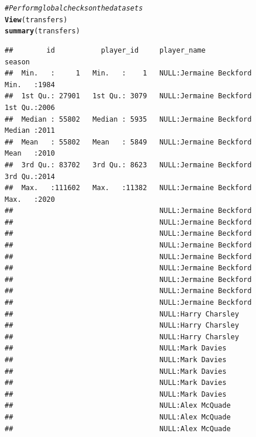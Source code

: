 \documentclass{article}\usepackage[]{graphicx}\usepackage[]{color}
\makeatletter
\newcommand{\hlcom}[1]{\textcolor[rgb]{0.678,0.584,0.686}{\textit{#1}}}%
\newcommand{\hlstd}[1]{\textcolor[rgb]{0.345,0.345,0.345}{#1}}%
\newcommand{\hlkwd}[1]{\textcolor[rgb]{0.737,0.353,0.396}{\textbf{#1}}}%
\newenvironment{kframe}{%
 \def\at@end@of@kframe{}%
 \ifinner\ifhmode%
  \def\at@end@of@kframe{\end{minipage}}%
  \begin{minipage}{\columnwidth}%
 \fi\fi%
 \def\FrameCommand##1{\hskip\@totalleftmargin \hskip-\fboxsep
 \colorbox{shadecolor}{##1}\hskip-\fboxsep
     \hskip-\linewidth \hskip-\@totalleftmargin \hskip\columnwidth}%
 \MakeFramed {\advance\hsize-\width
   \@totalleftmargin\z@ \linewidth\hsize
   \@setminipage}}%
 {\par\unskip\endMakeFramed%
 \at@end@of@kframe}
\newenvironment{knitrout}{}{} %
\makeatother
\begin{document}
\begin{knitrout}
\begin{kframe}
\begin{alltt}
\hlcom{# Perform global checks on the data sets}
\hlkwd{View}\hlstd{(transfers)}
\hlkwd{summary}\hlstd{(transfers)}
\end{alltt}
\begin{verbatim}
##        id           player_id     player_name                                season    
##  Min.   :     1   Min.   :    1   NULL:Jermaine Beckford                 Min.   :1984  
##  1st Qu.: 27901   1st Qu.: 3079   NULL:Jermaine Beckford                 1st Qu.:2006  
##  Median : 55802   Median : 5935   NULL:Jermaine Beckford                 Median :2011  
##  Mean   : 55802   Mean   : 5849   NULL:Jermaine Beckford                 Mean   :2010  
##  3rd Qu.: 83702   3rd Qu.: 8623   NULL:Jermaine Beckford                 3rd Qu.:2014  
##  Max.   :111602   Max.   :11382   NULL:Jermaine Beckford                 Max.   :2020  
##                                   NULL:Jermaine Beckford                               
##                                   NULL:Jermaine Beckford                               
##                                   NULL:Jermaine Beckford                               
##                                   NULL:Jermaine Beckford                               
##                                   NULL:Jermaine Beckford                               
##                                   NULL:Jermaine Beckford                               
##                                   NULL:Jermaine Beckford                               
##                                   NULL:Jermaine Beckford                               
##                                   NULL:Jermaine Beckford                               
##                                   NULL:Harry Charsley                                  
##                                   NULL:Harry Charsley                                  
##                                   NULL:Harry Charsley                                  
##                                   NULL:Mark Davies                                     
##                                   NULL:Mark Davies                                     
##                                   NULL:Mark Davies                                     
##                                   NULL:Mark Davies                                     
##                                   NULL:Mark Davies                                     
##                                   NULL:Alex McQuade                                    
##                                   NULL:Alex McQuade                                    
##                                   NULL:Alex McQuade                                    

\end{verbatim}
\end{kframe}
\end{knitrout}
\end{document}
